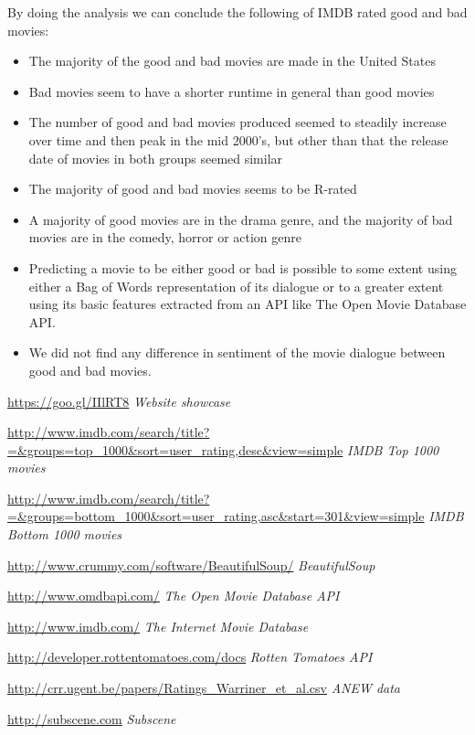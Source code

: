 \documentclass{acm_proc_article-sp}
\begin{document}
By doing the analysis we can conclude the following of IMDB rated good and bad movies:
\begin{itemize}
\item The majority of the good and bad movies are made in the United States
\item Bad movies seem to have a shorter runtime in general than good movies
\item The number of good and bad movies produced seemed to steadily increase over time and then peak in the mid 2000's, but other than that the release date of movies in both groups seemed similar
\item The majority of good and bad movies seems to be R-rated
\item A majority of good movies are in the drama genre, and the majority of bad movies are in the comedy, horror or action genre
\item Predicting a movie to be either good or bad is possible to some extent using either a Bag of Words representation of its dialogue or to a greater extent using its basic features extracted from an API like The Open Movie Database API.
\item We did not find any difference in sentiment of the movie dialogue between good and bad movies.
\end{itemize}



\begin{thebibliography}{9}

\url{https://goo.gl/IIlRT8}
\textit{Website showcase}

\url{http://www.imdb.com/search/title?=&groups=top_1000&sort=user_rating,desc&view=simple}
\textit{IMDB Top 1000 movies}

\url{http://www.imdb.com/search/title?=&groups=bottom_1000&sort=user_rating,asc&start=301&view=simple}
\textit{IMDB Bottom 1000 movies}

\url{http://www.crummy.com/software/BeautifulSoup/}
\textit{BeautifulSoup}

\url{http://www.omdbapi.com/}
\textit{The Open Movie Database API}

\url{http://www.imdb.com/}
\textit{The Internet Movie Database}

\url{http://developer.rottentomatoes.com/docs}
\textit{Rotten Tomatoes API}

\url{http://crr.ugent.be/papers/Ratings_Warriner_et_al.csv}
\textit{ANEW data}

\url{http://subscene.com}
\textit{Subscene}

\end{thebibliography}
\end{document}
